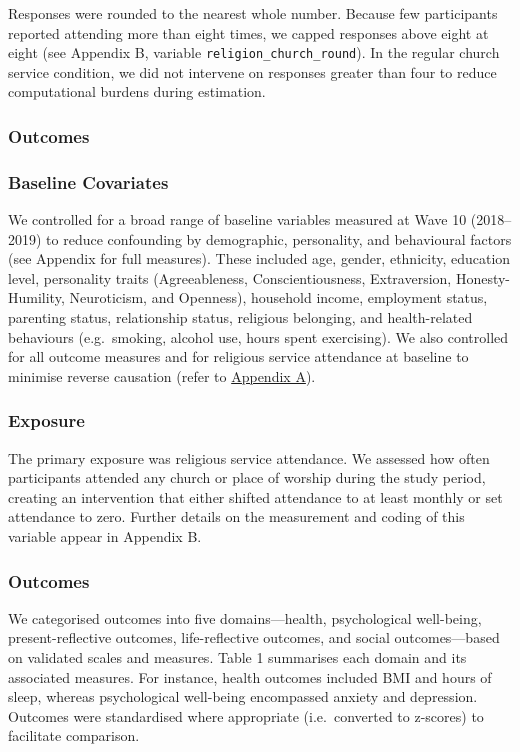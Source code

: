 \documentclass[
  single column]{article}
\begin{document}
Responses were rounded to the nearest whole number. Because few
participants reported attending more than eight times, we capped
responses above eight at eight (see Appendix B, variable
\texttt{religion\_church\_round}). In the regular church service
condition, we did not intervene on responses greater than four to reduce
computational burdens during estimation.

\subsubsection{Outcomes}\label{outcomes}

\subsubsection{Baseline Covariates}\label{baseline-covariates}

We controlled for a broad range of baseline variables measured at Wave
10 (2018--2019) to reduce confounding by demographic, personality, and
behavioural factors (see Appendix for full measures). These included
age, gender, ethnicity, education level, personality traits
(Agreeableness, Conscientiousness, Extraversion, Honesty-Humility,
Neuroticism, and Openness), household income, employment status,
parenting status, relationship status, religious belonging, and
health-related behaviours (e.g.~smoking, alcohol use, hours spent
exercising). We also controlled for all outcome measures and for
religious service attendance at baseline to minimise reverse causation
(refer to \href{appendix-measures}{Appendix A}).

\subsubsection{Exposure}\label{exposure}

The primary exposure was religious service attendance. We assessed how
often participants attended any church or place of worship during the
study period, creating an intervention that either shifted attendance to
at least monthly or set attendance to zero. Further details on the
measurement and coding of this variable appear in Appendix B.

\subsubsection{Outcomes}\label{outcomes-1}

We categorised outcomes into five domains---health, psychological
well-being, present-reflective outcomes, life-reflective outcomes, and
social outcomes---based on validated scales and measures. Table 1
summarises each domain and its associated measures. For instance, health
outcomes included BMI and hours of sleep, whereas psychological
well-being encompassed anxiety and depression. Outcomes were
standardised where appropriate (i.e.~converted to z-scores) to
facilitate comparison.
\end{document}
